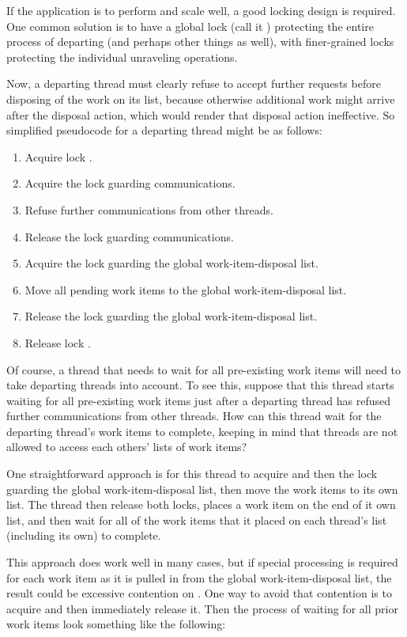 {	If the application is to perform and scale well, a good locking
	design is required.
	One common solution is to have a global lock (call it )
	protecting the entire
	process of departing (and perhaps other things as well),
	with finer-grained locks protecting the
	individual unraveling operations.

	Now, a departing thread must clearly refuse to accept further
	requests before disposing of the work on its list, because
	otherwise additional work might arrive after the disposal action,
	which would render that disposal action ineffective.
	So simplified pseudocode for a departing thread might be as follows:

	\begin{enumerate}
	\item	Acquire lock .
	\item	Acquire the lock guarding communications.
	\item	Refuse further communications from other threads.
	\item	Release the lock guarding communications.
	\item	Acquire the lock guarding the global work-item-disposal list.
	\item	Move all pending work items to the global
		work-item-disposal list.
	\item	Release the lock guarding the global work-item-disposal list.
	\item	Release lock .
	\end{enumerate}

	Of course, a thread that needs to wait for all pre-existing work
	items will need to take departing threads into account.
	To see this, suppose that this thread starts waiting for all
	pre-existing work items just after a departing thread has refused
	further communications from other threads.
	How can this thread wait for the departing thread's work items
	to complete, keeping in mind that threads are not allowed to
	access each others' lists of work items?

	One straightforward approach is for this thread to acquire 
	and then the lock guarding the global work-item-disposal list, then
	move the work items to its own list.
	The thread then release both locks,
	places a work item on the end of it own list,
	and then wait for all of the work items that it placed on each thread's
	list (including its own) to complete.

	This approach does work well in many cases, but if special
	processing is required for each work item as it is pulled in
	from the global work-item-disposal list, the result could be
	excessive contention on .
	One way to avoid that contention is to acquire  and then
	immediately release it.
	Then the process of waiting for all prior work items look
	something like the following:

}
